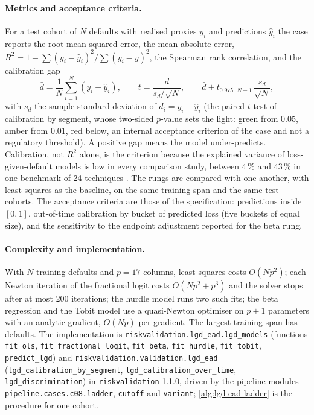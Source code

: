 \paragraph{Metrics and acceptance criteria.} For a test cohort of $N$ defaults with realised proxies $y_i$ and predictions $\hat y_i$ the case reports the root mean squared error, the mean absolute error, $R^{2}=1-\sum(y_i-\hat y_i)^2/\sum(y_i-\bar y)^2$, the Spearman rank correlation, and the calibration gap
\begin{equation}
\bar d=\frac1N\sum_{i=1}^{N}(y_i-\hat y_i),\qquad t=\frac{\bar d}{s_d/\sqrt N},\qquad \bar d\pm t_{0.975,\,N-1}\,\frac{s_d}{\sqrt N},
\label{eq:lgd-ead-gap}
\end{equation}
with $s_d$ the sample standard deviation of $d_i=y_i-\hat y_i$ (the paired $t$-test of calibration by segment, whose two-sided $p$-value sets the light: green from $0.05$, amber from $0.01$, red below, an internal acceptance criterion of the case and not a regulatory threshold). A positive gap means the model under-predicts. Calibration, not $R^{2}$ alone, is the criterion because the explained variance of loss-given-default models is low in every comparison study, between 4\,\% and 43\,\% in one benchmark of 24 techniques \citep{lgd-ead:loterman2012}. The rungs are compared with one another, with least squares as the baseline, on the same training span and the same test cohorts. The acceptance criteria are those of the specification: predictions inside $[0,1]$, out-of-time calibration by bucket of predicted loss (five buckets of equal size), and the sensitivity to the endpoint adjustment reported for the beta rung.

\paragraph{Complexity and implementation.} With $N$ training defaults and $p=17$ columns, least squares costs $O(Np^{2})$; each Newton iteration of the fractional logit costs $O(Np^{2}+p^{3})$ and the solver stops after at most 200 iterations; the hurdle model runs two such fits; the beta regression and the Tobit model use a quasi-Newton optimiser on $p+1$ parameters with an analytic gradient, $O(Np)$ per gradient. The largest training span has  defaults. The implementation is \texttt{riskvalidation.lgd\_ead.lgd\_models} (functions \texttt{fit\_ols}, \texttt{fit\_fractional\_logit}, \texttt{fit\_beta}, \texttt{fit\_hurdle}, \texttt{fit\_tobit}, \texttt{predict\_lgd}) and \texttt{riskvalidation.validation.lgd\_ead} (\texttt{lgd\_calibration\_by\_segment}, \texttt{lgd\_calibration\_over\_time}, \texttt{lgd\_discrimination}) in \texttt{riskvalidation} 1.1.0, driven by the pipeline modules \texttt{pipeline.cases.c08.ladder}, \texttt{cutoff} and \texttt{variant}; \cref{alg:lgd-ead-ladder} is the procedure for one cohort.

